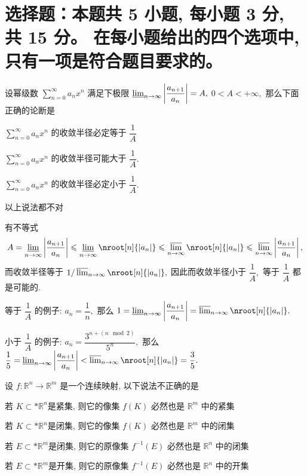 \fi


\section{%
  选择题：本题共 5 小题, 每小题 3 分, 共 15 分。
  在每小题给出的四个选项中, 只有一项是符合题目要求的。
}


\begin{question}
设幂级数 $\sum\limits_{n=0}^\infty a_n x^n$ 满足下极限 $\varliminf_{n\to\infty} \left\lvert \dfrac{a_{n+1}}{a_n} \right\rvert = A,$ $0 < A < +\infty,$ 那么下面正确的论断是 \paren[D]

\begin{choices}
\item $\sum\limits_{n=0}^\infty a_n x^n$ 的收敛半径必定等于 $\dfrac{1}{A}$
\item $\sum\limits_{n=0}^\infty a_n x^n$ 的收敛半径可能大于 $\dfrac{1}{A}.$
\item $\sum\limits_{n=0}^\infty a_n x^n$ 的收敛半径必定小于 $\dfrac{1}{A}.$
\item 以上说法都不对
\end{choices}
\end{question}

\begin{solution}
有不等式
$$A = \varliminf_{n\to\infty} \left\lvert \dfrac{a_{n+1}}{a_n} \right\rvert \leqslant \varliminf_{n\to\infty} \nroot[n]{\lvert a_n \rvert} \leqslant \varlimsup_{n\to\infty} \nroot[n]{\lvert a_n \rvert} \leqslant \varlimsup_{n\to\infty}  \left\lvert \dfrac{a_{n+1}}{a_n} \right\rvert,$$
而收敛半径等于 $1 / \varlimsup_{n\to\infty} \nroot[n]{\lvert a_n \rvert},$ 因此而收敛半径小于 $\dfrac{1}{A},$ 等于 $\dfrac{1}{A}$ 都是可能的.

等于 $\dfrac{1}{A}$ 的例子: $a_n = \dfrac{1}{n},$ 那么 $1 = \varliminf_{n\to\infty} \left\lvert \dfrac{a_{n+1}}{a_n} \right\rvert = \varlimsup_{n\to\infty} \nroot[n]{\lvert a_n \rvert}.$

小于 $\dfrac{1}{A}$ 的例子: $a_n = \dfrac{3^{n + (n \mod 2)}}{5^n},$ 那么 $\dfrac{1}{5} = \varliminf_{n\to\infty} \left\lvert \dfrac{a_{n+1}}{a_n} \right\rvert < \varlimsup_{n\to\infty} \nroot[n]{\lvert a_n \rvert} = \dfrac{3}{5}.$
\end{solution}

\begin{question}
设 $f: \mathbb{R}^n \to \mathbb{R}^m$ 是一个连续映射, 以下说法不正确的是 \paren[B]

\begin{choices}
\item 若 $K \subset* \mathbb{R}^n$是紧集, 则它的像集 $f(K)$ 必然也是 $\mathbb{R}^m$ 中的紧集
\item 若 $K \subset* \mathbb{R}^n$是闭集, 则它的像集 $f(K)$ 必然也是 $\mathbb{R}^m$ 中的闭集
\item 若 $E \subset* \mathbb{R}^m$是闭集, 则它的原像集 $f^{-1}(E)$ 必然也是 $\mathbb{R}^n$ 中的闭集
\item 若 $E \subset* \mathbb{R}^m$是开集, 则它的原像集 $f^{-1}(E)$ 必然也是 $\mathbb{R}^n$ 中的开集
\end{choices}
\end{question}

